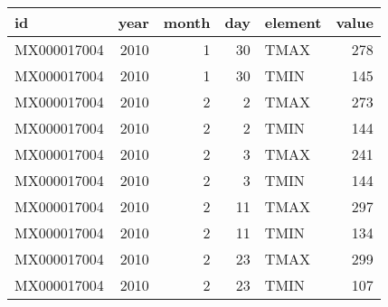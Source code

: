 \begin{tabular}{lrrrlr}
  \toprule
 id & year & month & day & element & value \\ 
  \midrule
  MX000017004 & 2010 &   1 &  30 & TMAX & 278 \\ 
  MX000017004 & 2010 &   1 &  30 & TMIN & 145 \\ 
  MX000017004 & 2010 &   2 &   2 & TMAX & 273 \\ 
  MX000017004 & 2010 &   2 &   2 & TMIN & 144 \\ 
  MX000017004 & 2010 &   2 &   3 & TMAX & 241 \\ 
  MX000017004 & 2010 &   2 &   3 & TMIN & 144 \\ 
  MX000017004 & 2010 &   2 &  11 & TMAX & 297 \\ 
  MX000017004 & 2010 &   2 &  11 & TMIN & 134 \\ 
  MX000017004 & 2010 &   2 &  23 & TMAX & 299 \\ 
  MX000017004 & 2010 &   2 &  23 & TMIN & 107 \\ 
   \bottomrule
\end{tabular}
